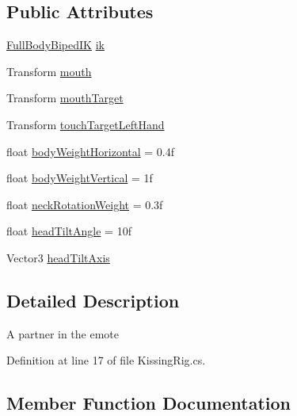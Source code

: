 \subsection*{Public Attributes}
\begin{DoxyCompactItemize}
\item 
\mbox{\hyperlink{class_root_motion_1_1_final_i_k_1_1_full_body_biped_i_k}{Full\+Body\+Biped\+IK}} \mbox{\hyperlink{class_root_motion_1_1_demos_1_1_kissing_rig_1_1_partner_a336ec57f33bf8b329e87699cacc958d0}{ik}}
\item 
Transform \mbox{\hyperlink{class_root_motion_1_1_demos_1_1_kissing_rig_1_1_partner_ada98a6f584150d57e62ee4347fd9d7c9}{mouth}}
\item 
Transform \mbox{\hyperlink{class_root_motion_1_1_demos_1_1_kissing_rig_1_1_partner_a8925cbfd5a6f097a4ba961171cb0356d}{mouth\+Target}}
\item 
Transform \mbox{\hyperlink{class_root_motion_1_1_demos_1_1_kissing_rig_1_1_partner_a8b618d3c8478a8d8ecb0c20f56006145}{touch\+Target\+Left\+Hand}}
\item 
float \mbox{\hyperlink{class_root_motion_1_1_demos_1_1_kissing_rig_1_1_partner_a9d2d1867154cafda29cef1aab4d55919}{body\+Weight\+Horizontal}} = 0.\+4f
\item 
float \mbox{\hyperlink{class_root_motion_1_1_demos_1_1_kissing_rig_1_1_partner_ab269e5b97b4a3e58231a54754596def1}{body\+Weight\+Vertical}} = 1f
\item 
float \mbox{\hyperlink{class_root_motion_1_1_demos_1_1_kissing_rig_1_1_partner_add59fc99897714cffc7b847ff8bde033}{neck\+Rotation\+Weight}} = 0.\+3f
\item 
float \mbox{\hyperlink{class_root_motion_1_1_demos_1_1_kissing_rig_1_1_partner_ac8956627cc15df423b4d34cb507d0be4}{head\+Tilt\+Angle}} = 10f
\item 
Vector3 \mbox{\hyperlink{class_root_motion_1_1_demos_1_1_kissing_rig_1_1_partner_a346d57a220d288c7cc1da5993b28e5aa}{head\+Tilt\+Axis}}
\end{DoxyCompactItemize}


\subsection{Detailed Description}
A partner in the emote 



Definition at line 17 of file Kissing\+Rig.\+cs.



\subsection{Member Function Documentation}
\mbox{\label{class_root_motion_1_1_demos_1_1_kissing_rig_1_1_partner_ae3787ff36f970459204a89e47cd7f2f8}} 
